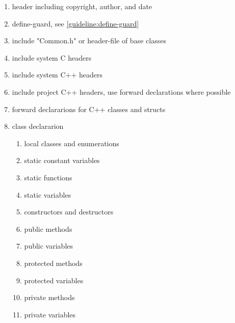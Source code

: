 \documentclass[a4paper,11pt,oneside]{scrbook}
\newcommand{\trfile}[1]{"#1"}
\begin{document}
\begin{enumerate}
  \item
    header including copyright, author, and date

  \item
    define-guard, see \ref{guideline:define-guard}

  \item
    include \trfile{Common.h} or header-file of base classes

  \item
    include system C headers

  \item
    include system C++ headers

  \item
    include project C++ headers, use forward declarations where possible

  \item
    forward declararions for C++ classes and structs

  \item
    class declararion

    \begin{enumerate}
      \item
        local classes and enumerations

      \item
        static constant variables

      \item
        static functions

      \item
        static variables

      \item
        constructors and destructors

      \item
        public methods

      \item
        public variables

      \item
        protected methods

      \item
        protected variables

      \item
        private methods

      \item
        private variables
    \end{enumerate}
\end{enumerate}
\end{document}
